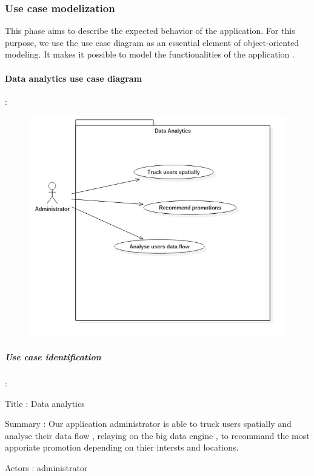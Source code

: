 \subsubsection{Use case modelization}
\label{sec:sec01}
This phase aims to describe the expected behavior of the application. 
For this purpose, we use the use case diagram as an essential element of object-oriented modeling. 
It makes it possible to model the functionalities of the application . 
\paragraph{Data analytics use case diagram} :
\label{sec:sec01}
\begin{figure}[H]
	\centering
	\includegraphics[height=0.4\textheight]{fig01/DataAnalyticsUseCasediagram}
	\label{fig:FilialesEtClients}
\end{figure}

\subparagraph{Use case identification} :
\label{sec:sec01} 

Title : Data analytics

Summary : Our application administrator is able to truck users spatially and analyse their data flow , relaying on
the big data engine , to recommand the most apporiate promotion depending on thier intersts and locations.

Actors : administrator

